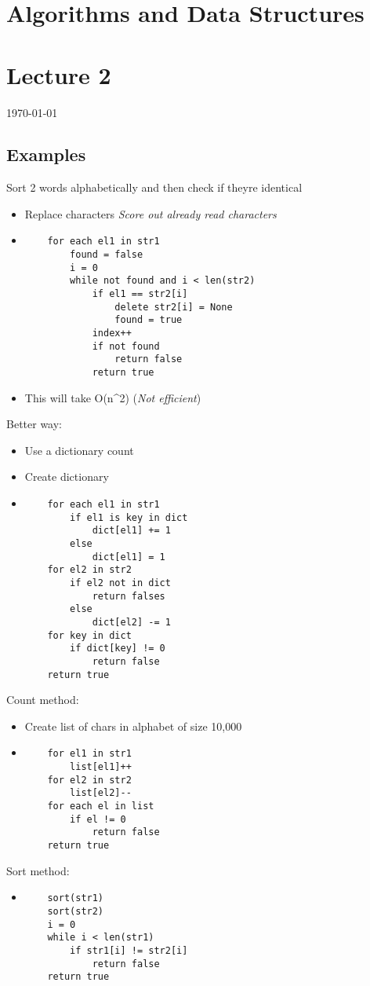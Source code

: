 \documentclass[12pt]{article}
\begin{document}
{\centering
\section*{Algorithms and Data Structures}
\section*{Lecture 2}
\indent\today
}

\subsection*{Examples}
Sort 2 words alphabetically and then check if theyre identical
\begin{itemize}
    \item Replace characters \textit{Score out already read characters}
    \item        
        \begin{lstlisting}
    for each el1 in str1 
        found = false 
        i = 0
        while not found and i < len(str2)
            if el1 == str2[i]
                delete str2[i] = None
                found = true
            index++
            if not found
                return false
            return true
       \end{lstlisting} 
   \item This will take O(n^2)  (\textit{Not efficient})
\end{itemize}
Better way:
\begin{itemize}
    \item Use a dictionary count
    \item Create dictionary
    \item \begin{lstlisting}
    for each el1 in str1
        if el1 is key in dict
            dict[el1] += 1
        else
            dict[el1] = 1
    for el2 in str2
        if el2 not in dict
            return falses
        else
            dict[el2] -= 1
    for key in dict
        if dict[key] != 0
            return false
    return true
        \end{lstlisting}
    \end{itemize}
    Count method:
    \begin{itemize}
        \item Create list of chars in alphabet of size 10,000
        \item \begin{lstlisting}
    for el1 in str1
        list[el1]++
    for el2 in str2
        list[el2]--
    for each el in list
        if el != 0
            return false
    return true
    \end{lstlisting}
\end{itemize}
Sort method:
    \begin{itemize}
        \item \begin{lstlisting}
    sort(str1)
    sort(str2)
    i = 0
    while i < len(str1)
        if str1[i] != str2[i]
            return false
    return true
        \end{lstlisting}
    \end{itemize}
\end{document}
